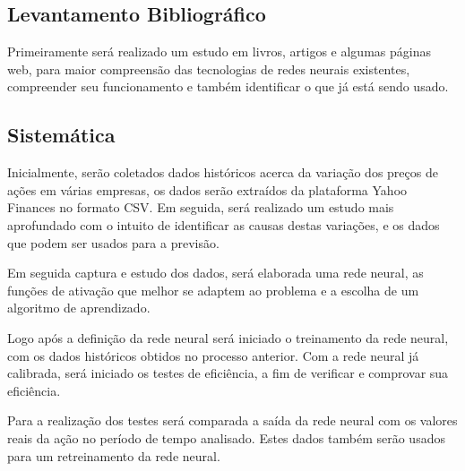 \subsection{Levantamento Bibliográfico}
Primeiramente será realizado um estudo em livros, artigos e algumas páginas web, para maior compreensão das tecnologias de redes neurais existentes, compreender seu funcionamento e também identificar o que já está sendo usado. 

\subsection{Sistemática}
Inicialmente, serão coletados dados históricos acerca da variação dos preços de ações em várias empresas, os dados serão extraídos da plataforma Yahoo Finances no formato CSV. Em seguida, será realizado um estudo mais aprofundado com o intuito de identificar as causas destas variações, e os dados que podem ser usados para a previsão. 

Em seguida captura e estudo dos dados, será elaborada uma rede neural, as funções de ativação que melhor se adaptem ao problema e a escolha de um algoritmo de aprendizado.

Logo após a definição da rede neural será iniciado o treinamento da rede neural, com os dados históricos obtidos no processo anterior. Com a rede neural já calibrada, será iniciado os testes de eficiência, a fim de verificar e comprovar sua eficiência.

Para a realização dos testes será comparada a saída da rede neural com os valores reais da ação no período de tempo analisado. Estes dados também serão usados para um retreinamento da rede neural.


